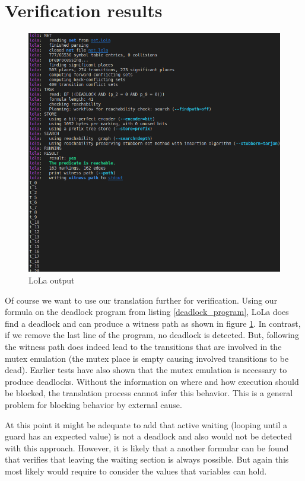 \section{Verification results}
\begin{figure}
  \centering
  \includegraphics[width=1\textwidth]{./pictures/lola_output.png}
  \caption{LoLa output}
  \label{lola_output}
\end{figure}
Of course we want to use our translation further for verification.
Using our formula on the deadlock program from listing \ref{deadlock_program}, LoLa does find a deadlock and can produce a witness path as shown in figure \ref{lola_output}.
In contrast, if we remove the last line of the program, no deadlock is detected.
But, following the witness path does indeed lead to the transitions that are involved in the mutex emulation (the mutex place is empty causing involved transitions to be dead).
Earlier tests have also shown that the mutex emulation is necessary to produce deadlocks.
Without the information on where and how execution should be blocked, the translation process cannot infer this behavior.
This is a general problem for blocking behavior by external cause.

At this point it might be adequate to add that active waiting (looping until a guard has an expected value) is not a deadlock and also would not be detected with this approach.
However, it is likely that a another formular can be found that verifies that leaving the waiting section is always possible.
But again this most likely would require to consider the values that variables can hold.

